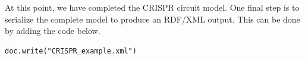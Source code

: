 At this point, we have completed the CRISPR circuit model. One final step is to serialize the complete model to produce an RDF/XML output. This can be done by adding the code below.

\vspace{\abovedisplayskip}
\begin{minipage}{0.95\textwidth}
\begin{lstlisting}
doc.write("CRISPR_example.xml")
\end{lstlisting}
\end{minipage}


